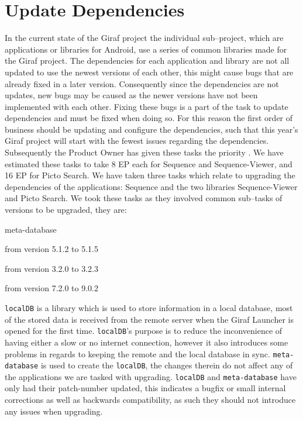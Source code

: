 \section{Update Dependencies}
In the current state of the Giraf project the individual sub--project, which are applications or libraries for Android, use a series of common libraries made for the Giraf project.
The dependencies for each application and library are not all updated to use the newest versions of each other, this might cause bugs that are already fixed in a later version.
Consequently since the dependencies are not updates, new bugs may be caused as the newer versions have not been implemented with each other.
Fixing these bugs is a part of the task to update dependencies and must be fixed when doing so.
For this reason the first order of business should be updating and configure the dependencies, such that this year's Giraf project will start with the fewest issues regarding the dependencies.
Subsequently the Product Owner has given these tasks the priority \phigh.
We have estimated these tasks to take 8 EP each for Sequence and Sequence-Viewer, and 16 EP for Picto Search.
We have taken three tasks which relate to upgrading the dependencies of the applications: Sequence and the two libraries Sequence-Viewer and Picto Search.
We took these tasks as they involved common sub--tasks of versions to be upgraded, they are:
\begin{dankscription}{\ttfamily}{meta-database}
    \item[localDB] from version 5.1.2 to 5.1.5
    \item[meta-database] from version 3.2.0 to 3.2.3
    \item[oasisLib] from version 7.2.0 to 9.0.2
\end{dankscription}
\texttt{localDB} is a library which is used to store information in a local database, most of the stored data is received from the remote server when the Giraf Launcher is opened for the first time.
\texttt{localDB}'s purpose is to reduce the inconvenience of having either a slow or no internet connection, however it also introduces some problems in regards to keeping the remote and the local database in sync.
\texttt{meta-database} is used to create the \texttt{localDB}, the changes therein do not affect any of the applications we are tasked with upgrading.
\texttt{localDB} and \texttt{meta-database} have only had their patch-number updated, this indicates a bugfix or small internal corrections as well as backwards compatibility, as such they should not introduce any issues when upgrading.

